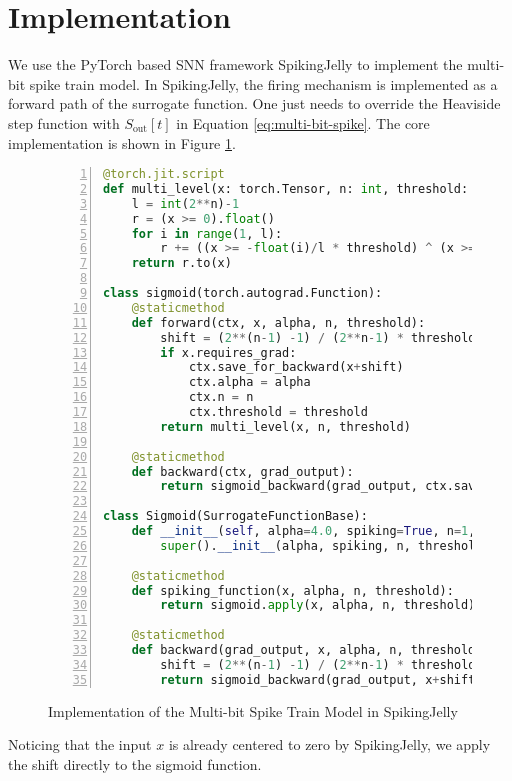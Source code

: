 \section{Implementation}
\label{sec:implementation}

    We use the PyTorch based SNN framework SpikingJelly \cite{doi:10.1126/sciadv.adi1480} to implement the multi-bit spike train model. In SpikingJelly, the firing mechanism is implemented as a forward path of the surrogate function. One just needs to override the Heaviside step function with $S_{\text{out}}[t]$ in Equation \ref{eq:multi-bit-spike}. The core implementation is shown in Figure \ref{listing:multi-bit-spike}.
    \begin{figure}[!htpb]
        \centering
        \begin{lstlisting}[language=Python, basicstyle=\small\ttfamily, breaklines=true, numbers=left, stepnumber=1]
@torch.jit.script
def multi_level(x: torch.Tensor, n: int, threshold: float):
    l = int(2**n)-1
    r = (x >= 0).float()
    for i in range(1, l):
        r += ((x >= -float(i)/l * threshold) ^ (x >= -float(i-1)/l * threshold)) * float(l-i)/l
    return r.to(x)

class sigmoid(torch.autograd.Function):
    @staticmethod
    def forward(ctx, x, alpha, n, threshold):
        shift = (2**(n-1) -1) / (2**n-1) * threshold
        if x.requires_grad:
            ctx.save_for_backward(x+shift)
            ctx.alpha = alpha
            ctx.n = n
            ctx.threshold = threshold
        return multi_level(x, n, threshold)

    @staticmethod
    def backward(ctx, grad_output):
        return sigmoid_backward(grad_output, ctx.saved_tensors[0], ctx.alpha, ctx.n, ctx.threshold)

class Sigmoid(SurrogateFunctionBase):
    def __init__(self, alpha=4.0, spiking=True, n=1, threshold=1.0):
        super().__init__(alpha, spiking, n, threshold)

    @staticmethod
    def spiking_function(x, alpha, n, threshold):
        return sigmoid.apply(x, alpha, n, threshold)

    @staticmethod
    def backward(grad_output, x, alpha, n, threshold):
        shift = (2**(n-1) -1) / (2**n-1) * threshold
        return sigmoid_backward(grad_output, x+shift, alpha, n, threshold)[0]
        \end{lstlisting}
        \caption{Implementation of the Multi-bit Spike Train Model in SpikingJelly}
        \label{listing:multi-bit-spike}
    \end{figure}

    Noticing that the input $x$ is already centered to zero by SpikingJelly, we apply the shift directly to the sigmoid function. 
